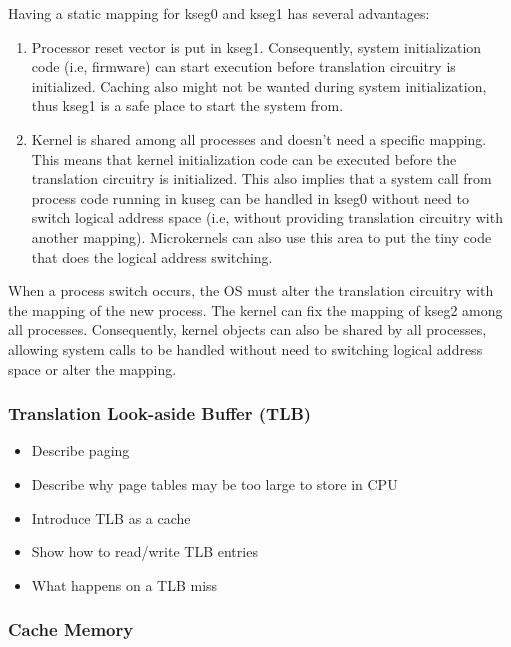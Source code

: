 \documentclass[]{scrartcl}
\begin{document}
Having a static mapping for kseg0 and kseg1 has several advantages:

\begin{enumerate}

\item Processor reset vector is put in kseg1. Consequently, system 
      initialization code (i.e, firmware) can start execution
      before translation circuitry is initialized. Caching also
      might not be wanted during system initialization, thus
      kseg1 is a safe place to start the system from.

\item Kernel is shared among all processes and doesn't need a specific
      mapping. This means that kernel initialization code can be
      executed before the translation circuitry is initialized. This
      also implies that a system call from process code running in
      kuseg can be handled in kseg0 without need to switch logical address
      space (i.e, without providing translation circuitry with another
      mapping). Microkernels can also use this area to put the tiny
      code that does the logical address switching.

\end{enumerate}

When a process switch occurs, the OS must alter the translation
circuitry with the mapping of the new process. The kernel
can fix the mapping of kseg2 among all processes. Consequently, kernel
objects can also be shared by all processes, allowing system calls
to be handled without need to switching logical address space
or alter the mapping.

\subsubsection{Translation Look-aside Buffer (TLB)}

\begin{itemize}
\item Describe paging
\item Describe why page tables may be too large to store in CPU
\item Introduce TLB as a cache
\item Show how to read/write TLB entries
\item What happens on a TLB miss
\end{itemize}

\subsubsection{Cache Memory}
\end{document}
